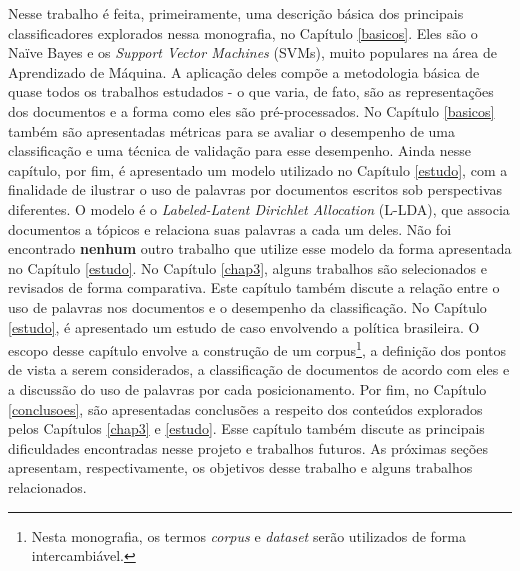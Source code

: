 Nesse trabalho é feita, primeiramente, uma descrição básica dos principais classificadores explorados nessa monografia, no Capítulo \ref{basicos}. Eles são o Naïve Bayes e os \emph{Support Vector Machines} (SVMs), muito populares na área de Aprendizado de Máquina. A aplicação deles compõe a metodologia básica de quase todos os trabalhos estudados - o que varia, de fato, são as representações dos documentos e a forma como eles são pré-processados. No Capítulo \ref{basicos} também são apresentadas métricas para se avaliar o desempenho de uma classificação e uma técnica de validação para esse desempenho. Ainda nesse capítulo, por fim, é apresentado um modelo utilizado no Capítulo \ref{estudo}, com a finalidade de ilustrar o uso de palavras por documentos escritos sob perspectivas diferentes. O modelo é o \emph{Labeled-Latent Dirichlet Allocation} (L-LDA), que associa documentos a tópicos e relaciona suas palavras a cada um deles. Não foi encontrado \textbf{nenhum} outro trabalho que utilize esse modelo da forma apresentada no Capítulo \ref{estudo}. No Capítulo \ref{chap3}, alguns trabalhos são selecionados e revisados de forma comparativa. Este capítulo também discute a relação entre o uso de palavras nos documentos e o desempenho da classificação. No Capítulo \ref{estudo}, é apresentado um estudo de caso envolvendo a política brasileira. O escopo desse capítulo envolve a construção de um corpus\footnote{Nesta monografia, os termos \emph{corpus} e \emph{dataset} serão utilizados de forma intercambiável.}, a definição dos pontos de vista a serem considerados, a classificação de documentos de acordo com eles e a discussão do uso de palavras por cada posicionamento. Por fim, no Capítulo \ref{conclusoes}, são apresentadas conclusões a respeito dos conteúdos explorados pelos Capítulos \ref{chap3} e \ref{estudo}. Esse capítulo também discute as principais dificuldades encontradas nesse projeto e trabalhos futuros. As próximas seções apresentam, respectivamente, os objetivos desse trabalho e alguns trabalhos relacionados.




   



